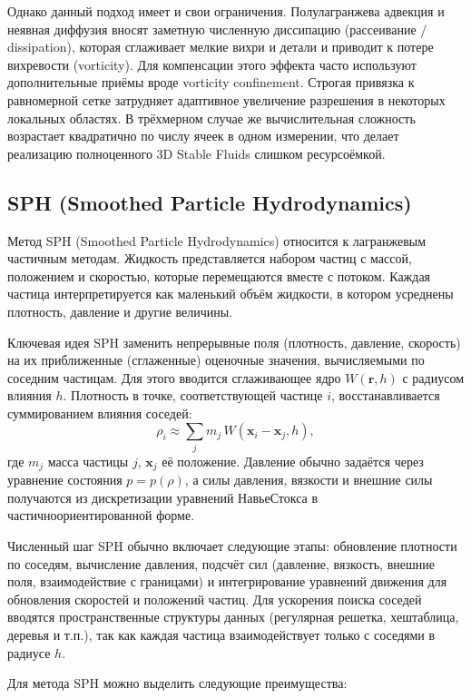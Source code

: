 Однако данный подход имеет и свои ограничения. Полулагранжева
адвекция и неявная диффузия вносят заметную численную диссипацию (рассеивание / dissipation),
которая сглаживает мелкие вихри и детали и приводит к потере
вихревости (vorticity). Для компенсации этого эффекта часто
используют дополнительные приёмы вроде vorticity confinement.
Строгая привязка к равномерной сетке затрудняет адаптивное
увеличение разрешения в некоторых локальных областях. В
трёхмерном случае же вычислительная сложность возрастает
квадратично по числу ячеек в одном измерении, что делает реализацию
полноценного 3D Stable Fluids слишком ресурсоёмкой.

\subsection{SPH (Smoothed Particle Hydrodynamics)}

Метод SPH (Smoothed Particle Hydrodynamics) \cite{chinapaper}
относится к лагранжевым частичным методам. Жидкость представляется
набором частиц с массой, положением и скоростью, которые
перемещаются вместе с потоком. Каждая частица интерпретируется
как маленький объём жидкости, в котором усреднены плотность,
давление и другие величины.

Ключевая идея SPH \textemdash{} заменить непрерывные поля (плотность,
давление, скорость) на их приближенные (сглаженные) оценочные значения, вычисляемыми по
соседним частицам. Для этого вводится сглаживающее ядро
$W(\mathbf{r}, h)$ с радиусом влияния $h$. Плотность в точке,
соответствующей частице $i$, восстанавливается суммированием
влияния соседей:
\[
      \rho_i \approx \sum_{j} m_j \,
      W(\mathbf{x}_i - \mathbf{x}_j, h),
\]
где $m_j$ \textemdash{} масса частицы $j$, $\mathbf{x}_j$ \textemdash{} её положение.
Давление обычно задаётся через уравнение состояния
$p = p(\rho)$, а силы давления, вязкости и внешние силы
получаются из дискретизации уравнений Навье\textemdash{}Стокса
в частично\textemdash{}ориентированной форме.

Численный шаг SPH обычно включает следующие этапы:
обновление плотности по соседям, вычисление давления,
подсчёт сил (давление, вязкость, внешние поля, взаимодействие
с границами) и интегрирование уравнений движения для
обновления скоростей и положений частиц. Для ускорения
поиска соседей вводятся пространственные структуры данных
(регулярная решетка, хеш\textemdash{}таблица, деревья и т.п.), так как
каждая частица взаимодействует только с соседями в радиусе $h$.

Для метода SPH можно выделить следующие преимущества:

